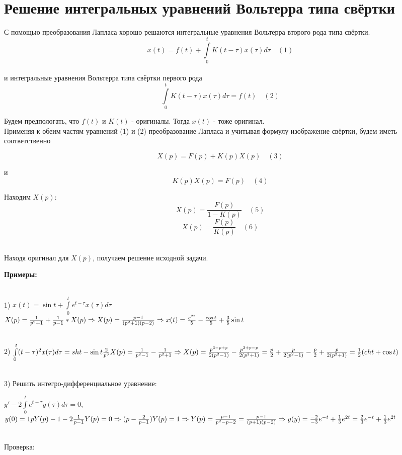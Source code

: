\documentclass[a4paper, 12pt]{report}
\begin{document}
\section{Решение интегральных уравнений Вольтерра типа свёртки}
С помощью преобразования Лапласа хорошо решаются интегральные уравнения Вольтерра второго рода типа свёртки.
\\ $$x(t)=f(t)+\int\limits_0^t K(t-\tau)x(\tau)d\tau\quad(1)$$   
\\ и интегральные уравнения Вольтерра типа свёртки первого рода 
\\ $$\int\limits_0^t K(t-\tau)x(\tau)d\tau = f(t)\quad (2)$$
\par\bigskip 
Будем предпологать, что \(f(t)\) и \(K(t)\) - оригиналы. Тогда \(x(t)\) - тоже оригинал.
\\ Применяя к обеим частям уравнений (1) и (2) преобразование Лапласа и учитывая формулу изображение свёртки, будем иметь соответственно
\par\bigskip
$$X(p)=F(p)+K(p)X(p)\quad (3)$$                  
\par и
$$K(p)X(p)=F(p) \quad (4)$$
\par\bigskip
Находим \(X(p)\): 
$$ X(p) = \frac{F(p)}{1-K(p)} \quad (5)$$                               
$$ X(p) = \frac{F(p)}{K(p)} \quad (6)$$
\par\bigskip
\\ Находя оригинал для \(X(p)\), получаем решение исходной задачи.
\par\bigskip
\textbf{Примеры:}
\par\bigskip
\\1) $x(t)=\sin t + \int\limits_0^t e^{t-\tau} x(\tau)d\tau$
\\ $X(p)=\frac{1}{p^2+1}+ \frac{1}{p-1} * X(p) \Rightarrow X(p)= \frac{p-1}{(p^2+1)(p-2)}
\\ \Rightarrow x(t)= \frac{e^{2t}}{5}- \frac{\cos t}{5}+ \frac{3}{5} \sin t $
\par\bigskip
\\2) $\int\limits_0^t (t-\tau)^2 x(\tau) d\tau = sh t - \sin t
\\ \frac{2}{p^3}X(p)= \frac{1}{p^2-1}- \frac{1}{p^2+1} \Rightarrow X(p)=\frac{p^{3-p+p}}{2(p^2-1)}-\frac{p^{3+p-p}}{2(p^2+1)}=\frac{p}{2}+ \frac{p}{2(p^2-1)}-\frac{p}{2}+ \frac{p}{2(p^2+1)}= \frac{1}{2}(cht + \cos t) $
\par\bigskip
\\ 3) Решить интегро-дифференциальное уравнение:
\par\bigskip
$y'-2\int\limits_0^t e^{t-\tau} y(\tau)d\tau=0$,   $y(0)=1
\\pY(p)-1 - 2\frac{1}{p-1} Y(p)=0 \Rightarrow (p-\frac{2}{p-1})Y(p)=1 \Rightarrow Y(p)= \frac{p-1}{p^2-p-2}=\frac{p-1}{(p+1)(p-2)} \Rightarrow y(y)= \frac{-2}{-3}e^{-t}+\frac{1}{3}e^{2t}=\frac{2}{3}e^{-t}+\frac{1}{3}e^{2t} $  
\par\bigskip 
\\ Проверка:
\end{document}

